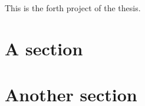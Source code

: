 This is the forth project of the thesis.

\lipsum[1]

\section{A section}
\lipsum[2]

\section{Another section}
\lipsum[3]